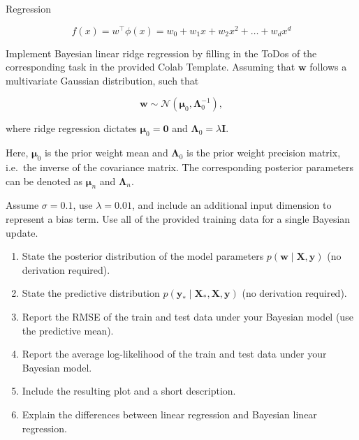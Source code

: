 \documentclass[
	english,
        solution=true
	]{tudaexercise}
\begin{document}
\begin{task}[points=34]{Regression}
\begin{subtask}[points=8, title=Polynomial Features]
\begin{solution}
            \[
            f(x) = w^\top \phi(x) = w_0 + w_1 x + w_2 x^2 + \dots + w_d x^d
            \]
        \end{solution}
    \end{subtask}

    \begin{subtask}[points=10, title=Bayesian Linear Regression]
        Implement Bayesian linear ridge regression by filling in the ToDos of the corresponding task in the provided Colab Template. Assuming that $\mathbf{w}$ follows a multivariate Gaussian distribution, such that
        
        \begin{equation*}
            \mathbf{w} \sim \mathcal{N}(\bm{\mu}_0, \bm{\Lambda}_0^{-1}),
        \end{equation*}

        where ridge regression dictates $\bm{\mu}_0 = \mathbf{0}$ and $\bm{\Lambda}_0 = \lambda \mathbf{I}$.

        Here, $\bm{\mu}_0$ is the prior weight mean and $\bm{\Lambda}_0$ is the prior weight precision matrix, i.e.~the inverse of the covariance matrix.
        The corresponding posterior parameters can be denoted as $\bm{\mu}_n$ and $\bm{\Lambda}_n$.

        Assume $\sigma = 0.1$, use $\lambda = 0.01$, and
        include an additional input dimension to represent a bias term.
        Use all of the provided training data for a single Bayesian update.

        \begin{enumerate}
            \item State the posterior distribution of the model parameters $p(\mathbf{w} \mid \mathbf{X}, \mathbf{y})$ (no derivation required). 
            \item State the predictive distribution $p(\mathbf{y}_* \mid \mathbf{X}_*, \mathbf{X}, \mathbf{y})$ (no derivation required). 
            \item Report the RMSE of the train and test data under your Bayesian model (use the predictive mean). 
            \item Report the average log-likelihood of the train and test data under your Bayesian model.
            \item Include the resulting plot and a short description. 
            \item Explain the differences between linear regression and Bayesian linear regression.
        \end{enumerate}


\end{subtask}
\end{task}
\end{document}
